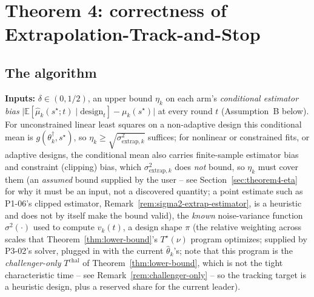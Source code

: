 %

\section{Theorem 4: correctness of Extrapolation-Track-and-Stop}
\label{sec:theorem4}

\subsection{The algorithm}
\label{sec:theorem4-algorithm}

\textbf{Inputs:} $\delta \in (0, 1/2)$, an upper bound $\eta_k$ on each arm's
\emph{conditional estimator bias} $\big|\mathbb{E}[\hat\mu_k(s^\star;t) \mid \text{design}_t] -
\mu_k(s^\star)\big|$ at every round $t$ (Assumption~B below). For unconstrained linear least
squares on a non-adaptive design this conditional mean is $g(\theta_k^{\dagger}, s^\star)$, so
$\eta_k \ge \sqrt{\sigma^2_{\mathrm{extrap},k}}$ suffices; for nonlinear or constrained fits, or
adaptive designs, the conditional mean also carries finite-sample estimator bias and
constraint (clipping) bias, which $\sigma^2_{\mathrm{extrap},k}$ does \emph{not} bound, so
$\eta_k$ must cover them (an \emph{assumed} bound supplied
by the user -- see Section~\ref{sec:theorem4-eta} for why it must be an input, not a
discovered quantity; a point estimate such as P1-06's clipped estimator,
Remark~\ref{rem:sigma2-extrap-estimator}, is a heuristic and does not by itself make the
bound valid), the \emph{known} noise-variance function $\sigma^2(\cdot)$ used to compute
$v_k(t)$, a design shape $\pi$ (the relative weighting across scales that
Theorem~\ref{thm:lower-bound}'s $T^\star(\nu)$ program optimizes; supplied by P3-02's
solver, plugged in with the current $\hat\theta_k$'s; note that this program is the
\emph{challenger-only} $T^{\mathrm{chal}}$ of Theorem~\ref{thm:lower-bound}, which is not
the tight characteristic time -- see Remark~\ref{rem:challenger-only} -- so the tracking
target is a heuristic design, plus a reserved share for the current leader).

